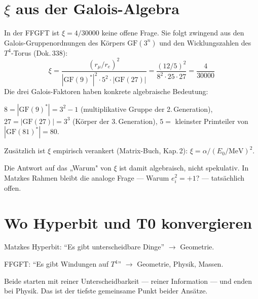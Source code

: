 \section[\texorpdfstring{$\xi$}{xi} aus der Galois-Algebra]{$\xi$ aus der Galois-Algebra}

In der FFGFT ist $\xi = 4/30000$ keine offene Frage. Sie folgt zwingend
aus den Galois-Gruppenordnungen des Körpers $\mathrm{GF}(3^n)$ und den
Wicklungszahlen des $T^4$-Torus (Dok.\,338):
\[
  \xi
  = \frac{(r_\mu/r_e)^2}{|\mathrm{GF}(9)^*|^2 \cdot 5^2 \cdot |\mathrm{GF}(27)|}
  = \frac{(12/5)^2}{8^2 \cdot 25 \cdot 27}
  = \frac{4}{30000}
\]
Die drei Galois-Faktoren haben konkrete algebraische Bedeutung: 

$8 = |\mathrm{GF}(9)^*| = 3^2 - 1$ (multiplikative Gruppe der 2.\,Generation),
$27 = |\mathrm{GF}(27)| = 3^3$ (Körper der 3.\,Generation),
$5 = $ kleinster Primteiler von $|\mathrm{GF}(81)^*| = 80$.

Zusätzlich ist $\xi$ empirisch verankert (Matrix-Buch, Kap.\,2):
$\xi = \alpha / (E_0/\mathrm{MeV})^2$.

Die Antwort auf das „Warum" von $\xi$ ist damit algebraisch, nicht
spekulativ. In Matzkes Rahmen bleibt die analoge Frage --- Warum
$e_i^2 = +1$? --- tatsächlich offen.

\section{Wo Hyperbit und T0 konvergieren}

Matzkes Hyperbit: \enquote{Es gibt unterscheidbare Dinge} $\to$ Geometrie.

FFGFT: \enquote{Es gibt Windungen auf $T^4$} $\to$ Geometrie, Physik, Massen.

Beide starten mit reiner Unterscheidbarkeit --- reiner Information ---
und enden bei Physik. Das ist der tiefste gemeinsame Punkt beider Ansätze.
